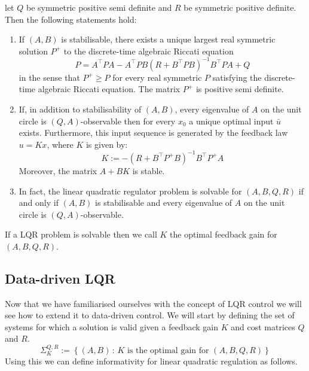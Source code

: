 {
	let $Q$ be symmetric positive semi definite and $R$ be symmetric positive definite. Then the following statements hold:
	\begin{enumerate}
		\item If $(A,B)$ is stabilisable, there exists a unique largest real symmetric solution $P^+$ to the discrete-time algebraic Riccati equation
		\begin{equation} \label{DARE}
			P = A^\top P A - A^\top P B (R+B^\top PB)^{-1} B^\top P A + Q
		\end{equation}
		in the sense that $P^+ \geq P$ for every real symmetric $P$ satisfying the discrete-time algebraic Riccati equation. The matrix $P^+$ is positive semi definite.
		\item If, in addition to stabilisability of $(A,B)$, every eigenvalue of $A$ on the unit circle is $(Q,A)$-observable then for every $x_0$ a unique optimal input $\bar{u}$ exists. Furthermore, this input sequence is generated by the feedback law $u = Kx$, where $K$ is given by:
		\begin{equation} \label{LQRK}
			K := -(R+B^\top P^+ B)^{-1} B^\top P^+ A
		\end{equation}
		Moreover, the matrix $A + BK$ is stable.
		\item In fact, the linear quadratic regulator problem is solvable for $(A,B,Q,R)$ if and only if $(A,B)$ is stabilisable and every eigenvalue of $A$ on the unit circle is $(Q,A)$-observable.
	\end{enumerate}
}
If a LQR problem is solvable then we call $K$ the optimal feedback gain for $(A,B,Q,R)$.

\subsection{Data-driven LQR}
Now that we have familiarised ourselves with the concept of LQR control we will see how to extend it to data-driven control. We will start by defining the set of systems for which a solution is valid given a feedback gain $K$ and cost matrices $Q$ and $R$.
\[ \Sigma_K^{Q,R} := \left\{ (A,B) \, : \, K \mbox{ is the optimal gain for } (A,B,Q,R) \right\} \]
Using this we can define informativity for linear quadratic regulation as follows.


